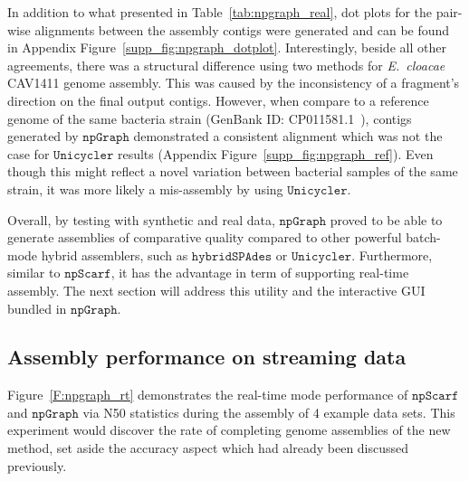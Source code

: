 \documentclass[10pt,twocolumn,twoside]{genpaper}
\newcommand{\npscarf}{$\mathtt{npScarf}$}
\newcommand{\npgraph}{$\mathtt{npGraph}$}
\newcommand{\unicycler}{$\mathtt{Unicycler}$}
\begin{document}
In addition to what presented in Table~\ref{tab:npgraph_real}, dot plots for the pair-wise alignments between the assembly contigs were generated and can be found in Appendix Figure~\ref{supp_fig:npgraph_dotplot}. Interestingly, beside all other agreements, there was a structural difference using two methods for \emph{E.~cloacae} CAV1411 genome assembly. This was caused by the inconsistency of a fragment's direction on the final output contigs. However, when compare to a reference genome of the same bacteria strain (GenBank ID: CP011581.1~\cite{Potter2016rapid}), contigs generated by \npgraph{} demonstrated a consistent alignment which was not the case for \unicycler{} results (Appendix Figure~\ref{supp_fig:npgraph_ref}). Even though this might reflect a novel variation between bacterial samples of the same strain, it was more likely a mis-assembly by using \unicycler{}.

Overall, by testing with synthetic and real data, \npgraph{} proved to be able to generate assemblies of comparative quality compared to other powerful batch-mode hybrid assemblers, such as $\mathtt{hybridSPAdes}$ or \unicycler{}.
Furthermore, similar to \npscarf{}, it has the advantage in term of supporting real-time assembly. The next section will address this utility and the interactive GUI bundled in \npgraph{}. 

\subsection*{Assembly performance on streaming data}
Figure~\ref{F:npgraph_rt} demonstrates the real-time mode performance of \npscarf{} and \npgraph{} via N50 statistics during the assembly of 4 example data sets.
This experiment would discover the rate of completing genome assemblies of the new method, set aside the accuracy aspect which had already been discussed previously.
\end{document}
